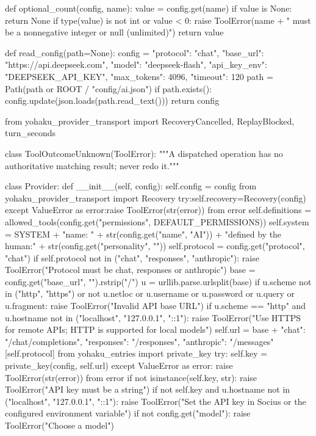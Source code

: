 def optional_count(config, name):
    value = config.get(name)
    if value is None:
        return None
    if type(value) is not int or value < 0:
        raise ToolError(name + " must be a nonnegative integer or null (unlimited)")
    return value

def read_config(path=None):
    config = {"protocol": "chat", "base_url": "https://api.deepseek.com", "model": "deepseek-flash",
        "api_key_env": "DEEPSEEK_API_KEY", "max_tokens": 4096, "timeout": 120}
    path = Path(path or ROOT / "config/ai.json")
    if path.exists():
        config.update(json.loads(path.read_text()))
    return config

from yohaku_provider_transport import RecoveryCancelled, ReplayBlocked, turn_seconds

class ToolOutcomeUnknown(ToolError):
    """A dispatched operation has no authoritative matching result; never redo it."""

class Provider:
    def __init__(self, config):
        self.config = config
        from yohaku_provider_transport import Recovery
        try:self.recovery=Recovery(config)
        except ValueError as error:raise ToolError(str(error)) from error
        self.definitions = allowed_tools(config.get("permissions", DEFAULT_PERMISSIONS))
        self.system = SYSTEM + "\nAI name: " + str(config.get("name", "AI")) + "\nPersonality defined by the human:\n" + str(config.get("personality", ""))
        self.protocol = config.get("protocol", "chat")
        if self.protocol not in ("chat", "responses", "anthropic"):
            raise ToolError("Protocol must be chat, responses or anthropic")
        base = config.get("base_url", "").rstrip("/")
        u = urllib.parse.urlsplit(base)
        if u.scheme not in ("http", "https") or not u.netloc or u.username or u.password or u.query or u.fragment:
            raise ToolError("Invalid API base URL")
        if u.scheme == "http" and u.hostname not in ("localhost", "127.0.0.1", "::1"):
            raise ToolError("Use HTTPS for remote APIs; HTTP is supported for local models")
        self.url = base + {"chat": "/chat/completions", "responses": "/responses", "anthropic": "/messages"}[self.protocol]
        from yohaku_entries import private_key
        try:
            self.key = private_key(config, self.url)
        except ValueError as error:
            raise ToolError(str(error)) from error
        if not isinstance(self.key, str):
            raise ToolError("API key must be a string")
        if not self.key and u.hostname not in ("localhost", "127.0.0.1", "::1"):
            raise ToolError("Set the API key in Socius or the configured environment variable")
        if not config.get("model"):
            raise ToolError("Choose a model")

